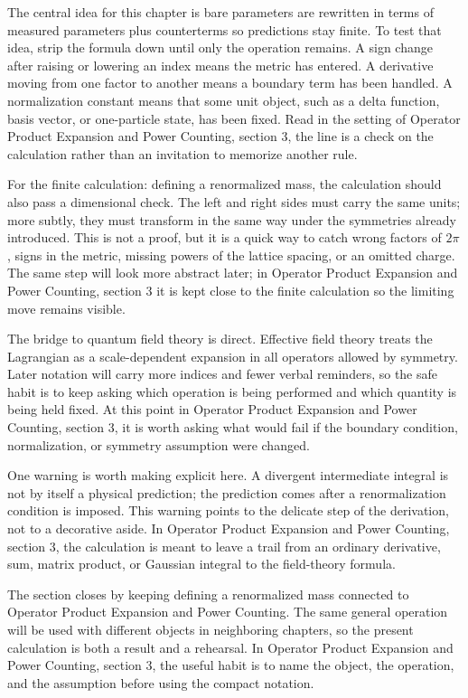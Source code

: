 The central idea for this chapter is bare parameters are rewritten in terms of measured parameters plus counterterms so predictions stay finite.  To test that idea, strip the formula down until only the operation remains.  A sign change after raising or lowering an index means the metric has entered.  A derivative moving from one factor to another means a boundary term has been handled.  A normalization constant means that some unit object, such as a delta function, basis vector, or one-particle state, has been fixed.  Read in the setting of Operator Product Expansion and Power Counting, section 3, the line is a check on the calculation rather than an invitation to memorize another rule.

For the finite calculation: defining a renormalized mass, the calculation should also pass a dimensional check.  The left and right sides must carry the same units; more subtly, they must transform in the same way under the symmetries already introduced.  This is not a proof, but it is a quick way to catch wrong factors of \(2\pi\), signs in the metric, missing powers of the lattice spacing, or an omitted charge.  The same step will look more abstract later; in Operator Product Expansion and Power Counting, section 3 it is kept close to the finite calculation so the limiting move remains visible.

The bridge to quantum field theory is direct.  Effective field theory treats the Lagrangian as a scale-dependent expansion in all operators allowed by symmetry.  Later notation will carry more indices and fewer verbal reminders, so the safe habit is to keep asking which operation is being performed and which quantity is being held fixed.  At this point in Operator Product Expansion and Power Counting, section 3, it is worth asking what would fail if the boundary condition, normalization, or symmetry assumption were changed.

One warning is worth making explicit here.  A divergent intermediate integral is not by itself a physical prediction; the prediction comes after a renormalization condition is imposed.  This warning points to the delicate step of the derivation, not to a decorative aside.  In Operator Product Expansion and Power Counting, section 3, the calculation is meant to leave a trail from an ordinary derivative, sum, matrix product, or Gaussian integral to the field-theory formula.

The section closes by keeping defining a renormalized mass connected to Operator Product Expansion and Power Counting.  The same general operation will be used with different objects in neighboring chapters, so the present calculation is both a result and a rehearsal.  In Operator Product Expansion and Power Counting, section 3, the useful habit is to name the object, the operation, and the assumption before using the compact notation.



